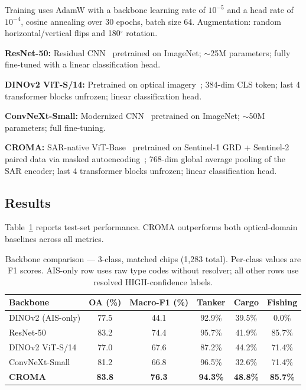 \documentclass[journal]{IEEEtran}
\begin{document}
Training uses AdamW with a backbone learning rate of $10^{-5}$ and a
head rate of $10^{-4}$, cosine annealing over 30 epochs, batch size 64.
Augmentation: random horizontal/vertical flips and 180$^\circ$ rotation.

\textbf{ResNet-50:} Residual CNN~\cite{he2016} pretrained on ImageNet;
$\sim$25M parameters; fully fine-tuned with a linear classification head.

\textbf{DINOv2 ViT-S/14:} Pretrained on optical imagery~\cite{oquab2023};
384-dim CLS token; last 4 transformer blocks unfrozen; linear classification
head.

\textbf{ConvNeXt-Small:} Modernized CNN~\cite{liu2022} pretrained on ImageNet;
$\sim$50M parameters; full fine-tuning.

\textbf{CROMA:} SAR-native ViT-Base~\cite{dosovitskiy2021} pretrained on
Sentinel-1 GRD + Sentinel-2 paired data via masked autoencoding~\cite{he2022mae,fuller2023};
768-dim global average pooling of the SAR encoder;
last 4 transformer blocks unfrozen; linear classification head.

\subsection{Results}

Table~\ref{tab:backbone} reports test-set performance.
CROMA outperforms both optical-domain baselines across all metrics.

\begin{table}[t]
\centering
\caption{Backbone comparison --- 3-class, matched chips (1,283 total).
Per-class values are F1 scores. AIS-only row uses raw type codes without
resolver; all other rows use resolved HIGH-confidence labels.}
\label{tab:backbone}
\begin{tabular}{lccccc}
\toprule
Backbone & OA (\%) & Macro-F1 (\%) & Tanker & Cargo & Fishing \\
\midrule
DINOv2 (AIS-only) & 77.5 & 44.1 & 92.9\% & 39.5\% & 0.0\% \\
\midrule
ResNet-50        & 83.2 & 74.4 & 95.7\% & 41.9\% & 85.7\% \\
DINOv2 ViT-S/14  & 77.0 & 67.6 & 87.2\% & 44.2\% & 71.4\% \\
ConvNeXt-Small   & 81.2 & 66.8 & 96.5\% & 32.6\% & 71.4\% \\
\textbf{CROMA}   & \textbf{83.8} & \textbf{76.3} & \textbf{94.3\%} & \textbf{48.8\%} & \textbf{85.7\%} \\
\bottomrule
\end{tabular}
\end{table}
\end{document}
